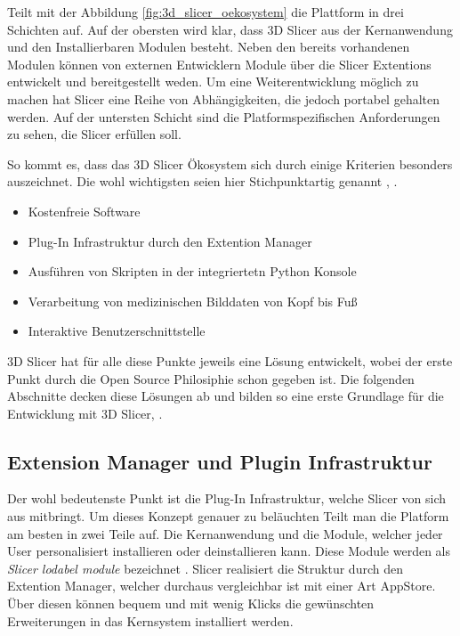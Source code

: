 \citet[Seite 1326]{fedorov2012slicer} Teilt mit der Abbildung \ref{fig:3d_slicer_oekosystem}
die Plattform in drei Schichten auf. Auf der obersten wird klar, dass 3D Slicer aus
der Kernanwendung und den Installierbaren Modulen besteht. Neben den bereits
vorhandenen Modulen können von externen Entwicklern Module über die Slicer
Extentions entwickelt und bereitgestellt weden. Um eine Weiterentwicklung möglich
zu machen hat Slicer eine Reihe von Abhängigkeiten, die jedoch portabel gehalten
werden. Auf der untersten Schicht sind die Platformspezifischen Anforderungen zu
sehen, die Slicer erfüllen soll.

So kommt es, dass das 3D Slicer Ökosystem sich durch einige Kriterien besonders auszeichnet.
Die wohl wichtigsten seien hier Stichpunktartig genannt \citep[vgl.][]{slicer2024},
\citep[vgl.][]{fedorov2012slicer}.

\begin{itemize}
	\item Kostenfreie Software

	\item Plug-In Infrastruktur durch den Extention Manager

	\item Ausführen von Skripten in der integriertetn Python Konsole

	\item Verarbeitung von medizinischen Bilddaten von Kopf bis Fuß

	\item Interaktive Benutzerschnittstelle
\end{itemize}

3D Slicer hat für alle diese Punkte jeweils eine Lösung entwickelt, wobei der erste
Punkt durch die Open Source Philosiphie schon gegeben ist. Die folgenden
Abschnitte decken diese Lösungen ab und bilden so eine erste Grundlage für die
Entwicklung mit 3D Slicer\citep[vgl.][]{slicer2024}, \citep[vgl.][]{fedorov2012slicer}.

\subsection{Extension Manager und Plugin Infrastruktur}
Der wohl bedeutenste Punkt ist die Plug-In Infrastruktur, welche Slicer von sich
aus mitbringt. Um dieses Konzept genauer zu beläuchten Teilt man die Platform am
besten in zwei Teile auf. Die Kernanwendung und die Module, welcher jeder User
personalisiert installieren oder deinstallieren kann. Diese Module werden als \textit{Slicer
lodabel module} bezeichnet \citep[vgl.][Seite 1332]{fedorov2012slicer}. Slicer realisiert
die Struktur durch den Extention Manager, welcher durchaus vergleichbar ist mit
einer Art AppStore. Über diesen können bequem und mit wenig Klicks die gewünschten
Erweiterungen in das Kernsystem installiert werden.

